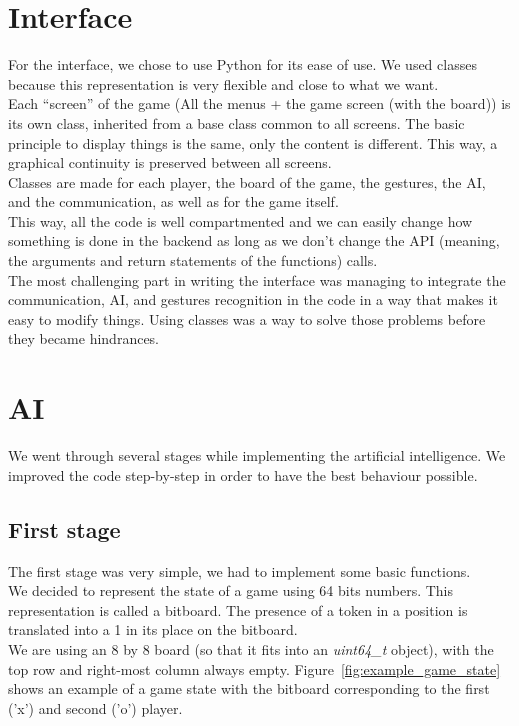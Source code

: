 \documentclass[12pt, a4paper, oneside]{report}
\begin{document}
	\section{Interface}
	For the interface, we chose to use Python for its ease of use. We used classes because this representation is very flexible and close to what we want. \\

	Each “screen” of the game (All the menus + the game screen (with the board)) is its own class, inherited from a base class common to all screens. The basic principle to display things is the same, only the content is different. This way, a graphical continuity is preserved between all screens. \\

	Classes are made for each player, the board of the game, the gestures, the AI, and the communication, as well as for the game itself. \\
	This way, all the code is well compartmented and we can easily change how something is done in the backend as long as we don't change the API (meaning, the arguments and return statements of the functions) calls. \\

	The most challenging part in writing the interface was managing to integrate the communication, AI, and gestures recognition in the code in a way that makes it easy to modify things. Using classes was a way to solve those problems before they became hindrances.

	\section{AI}\label{AI_section}

	We went through several stages while implementing the artificial intelligence. We improved the code step-by-step in order to have the best behaviour possible. \\

	\subsection{First stage}
	The first stage was very simple, we had to implement some basic functions. \\
	We decided to represent the state of a game using 64 bits numbers. This representation is called a bitboard. The presence of a token in a position is translated into a 1 in its place on the bitboard. \\
	We are using an 8 by 8 board (so that it fits into an \textit{uint64\_t} object), with the top row and right-most column always empty. Figure~\ref{fig:example_game_state} shows an example of a game state with the bitboard corresponding to the first ('x') and second ('o') player.
\end{document}
